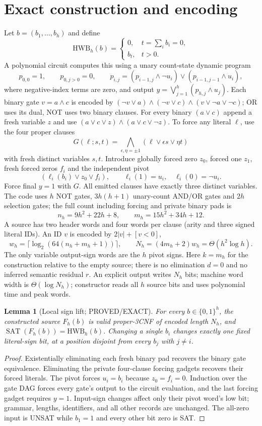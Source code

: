 \documentclass[11pt]{article}
\newtheorem{lemma}{Lemma}
\begin{document}
\section{Exact construction and encoding}
Let $b=(b_1,\ldots,b_h)$ and define
\[
 \mathrm{HWB}_h(b)=\begin{cases}0,&t=\sum_i b_i=0,\\b_t,&t>0.\end{cases}
\]
A polynomial circuit computes this using a unary count-state dynamic program
\[
p_{0,0}=1,\qquad p_{0,j>0}=0,\qquad
p_{i,j}=(p_{i-1,j}\land\neg u_i)\lor(p_{i-1,j-1}\land u_i),
\]
where negative-index terms are zero, and output
$y=\bigvee_{j=1}^h(p_{h,j}\land u_j)$.
Each binary gate $v=a\land c$ is encoded by
$(\neg v\lor a)\land(\neg v\lor c)\land(v\lor\neg a\lor\neg c)$;
OR uses its dual, NOT uses two binary clauses.
For every binary $(a\lor c)$ append a fresh variable $z$ and use
$(a\lor c\lor z)\land(a\lor c\lor\neg z)$.
To force any literal $\ell$, use the four proper clauses
\[
G(\ell;s,t)=\bigwedge_{\epsilon,\eta=\pm1}
(\ell\lor\epsilon s\lor\eta t)
\]
with fresh distinct variables $s,t$.
Introduce globally forced zero $z_0$, forced one $z_1$,
fresh forced zeros $f_i$ and the independent pivot
\[
 (\ell_i(b_i)\lor z_0\lor f_i),\qquad
 \ell_i(1)=u_i,\quad\ell_i(0)=\neg u_i.
\]
Force final $y=1$ with $G$. All emitted clauses have exactly three distinct variables.
The code uses $h$ NOT gates, $3h(h+1)$ unary-count AND/OR gates and $2h$ selection gates; the full count including forcing and private binary pads is
\[
 n_h=9h^2+22h+8,\qquad m_h=15h^2+34h+12.
\]
A source has two header words and four words per clause (arity and three signed literal IDs). An ID $v$ is encoded by $2|v|+[v<0]$,
\[
w_h=\lceil\log_2(64(n_h+m_h+1))\rceil,\qquad
N_h=(4m_h+2)w_h=\Theta(h^2\log h).
\]
The only variable output-sign words are the $h$ pivot signs.
Here $k=m_h$ for the construction relative to the empty source;
there is no elimination $d=0$ and no inferred semantic residual $r$.
An explicit output writes $N_h$ bits; machine word width is $\Theta(\log N_h)$; constructor reads all $h$ source bits and uses polynomial time and peak words.

\begin{lemma}[Local sign lift; PROVED/EXACT]
For every $b\in\{0,1\}^h$, the constructed source $F_h(b)$ is valid proper-3CNF of encoded length $N_h$, and
$\operatorname{SAT}(F_h(b))=\mathrm{HWB}_h(b)$.
Changing a single $b_i$ changes exactly one fixed literal-sign bit, at a position disjoint from every $b_j$ with $j\ne i$.
\end{lemma}
\begin{proof}
Existentially eliminating each fresh binary pad recovers the binary gate equivalence. Eliminating the private four-clause forcing gadgets recovers their forced literals. The pivot forces $u_i=b_i$ because $z_0=f_i=0$. Induction over the gate DAG forces every gate's output to the circuit evaluation, and the last forcing gadget requires $y=1$. Input-sign changes affect only their pivot word's low bit; grammar, lengths, identifiers, and all other records are unchanged. The all-zero input is UNSAT while $b_1=1$ and every other bit zero is SAT.
\end{proof}
\end{document}

